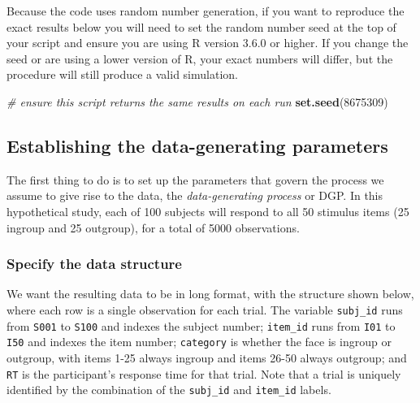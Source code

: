 \documentclass[english,doc,floatsintext]{apa6}
\newenvironment{Shaded}{\begin{snugshade}}{\end{snugshade}}
\newcommand{\CommentTok}[1]{\textcolor[rgb]{0.56,0.35,0.01}{\textit{#1}}}
\newcommand{\DecValTok}[1]{\textcolor[rgb]{0.00,0.00,0.81}{#1}}
\newcommand{\KeywordTok}[1]{\textcolor[rgb]{0.13,0.29,0.53}{\textbf{#1}}}
\newcommand{\NormalTok}[1]{#1}
\begin{document}
Because the code uses random number generation, if you want to reproduce the exact results below you will need to set the random number seed at the top of your script and ensure you are using R version 3.6.0 or higher. If you change the seed or are using a lower version of R, your exact numbers will differ, but the procedure will still produce a valid simulation.

\begin{Shaded}
\begin{Highlighting}[]
\CommentTok{# ensure this script returns the same results on each run}
\KeywordTok{set.seed}\NormalTok{(}\DecValTok{8675309}\NormalTok{)}
\end{Highlighting}
\end{Shaded}

\hypertarget{establishing-the-data-generating-parameters}{%
\subsection{Establishing the data-generating parameters}\label{establishing-the-data-generating-parameters}}

The first thing to do is to set up the parameters that govern the process we assume to give rise to the data, the \emph{data-generating process} or DGP. In this hypothetical study, each of 100 subjects will respond to all 50 stimulus items (25 ingroup and 25 outgroup), for a total of 5000 observations.

\hypertarget{specify-the-data-structure}{%
\subsubsection{Specify the data structure}\label{specify-the-data-structure}}

We want the resulting data to be in long format, with the structure shown below, where each row is a single observation for each trial. The variable \texttt{subj\_id} runs from \texttt{S001} to \texttt{S100} and indexes the subject number; \texttt{item\_id} runs from \texttt{I01} to \texttt{I50} and indexes the item number; \texttt{category} is whether the face is ingroup or outgroup, with items 1-25 always ingroup and items 26-50 always outgroup; and \texttt{RT} is the participant's response time for that trial. Note that a trial is uniquely identified by the combination of the \texttt{subj\_id} and \texttt{item\_id} labels.
\end{document}
